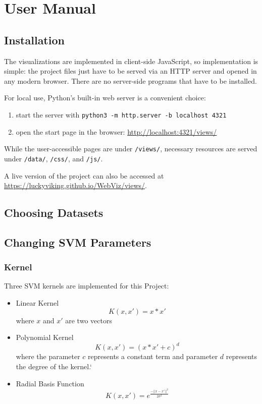 \documentclass{scrartcl}
\begin{document}
\section{User Manual}

\subsection{Installation}

The visualizations are implemented in client-side JavaScript,
so implementation is simple:
the project files just have to be served via an HTTP server
and opened in any modern browser.
There are no server-side programs that have to be installed.

For local use, Python's built-in web server is a convenient choice:

\begin{enumerate}
	\item start the server with \verb|python3 -m http.server -b localhost 4321|
	\item open the start page in the browser: \url{http://localhost:4321/views/}
\end{enumerate}

While the user-accessible pages are under \verb|/views/|,
necessary resources are served under
\verb|/data/|, \verb|/css/|, and \verb|/js/|.

A live version of the project can also be accessed at
\url{https://luckyviking.github.io/WebViz/views/}.

\subsection{Choosing Datasets}


\subsection{Changing SVM Parameters}

\subsubsection*{Kernel}
Three SVM kernels are implemented for this Project:
\begin{itemize}
	\item Linear Kernel \[K(x,x') = x*x'\] where $x$ and $x'$ are two vectors
	\item Polynomial Kernel \[K(x,x') = (x*x' + c)^d\] where the parameter $c$ represents a constant term and parameter $d$ represents the degree of the kernel.`
	\item Radial Basis Function \[K(x,x') = e^{\frac{-||x-x'||^{2}}{2\sigma^2} }\]
\end{itemize}
\end{document}
